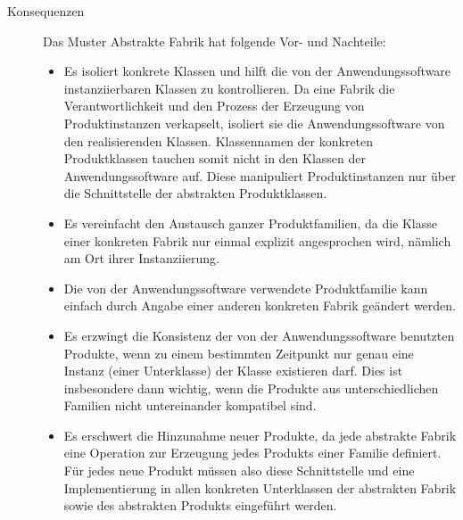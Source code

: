 \begin{description}
	\vspace{1mm} %
	
	\item[Konsequenzen] Das Muster Abstrakte Fabrik hat folgende Vor- und Nachteile:
	\begin{itemize}
		\item 	Es isoliert konkrete Klassen und hilft die von der Anwendungssoftware instanziierbaren Klassen zu kontrollieren. Da eine Fabrik die Verantwortlichkeit und den Prozess der Erzeugung von Produkt\-instanzen verkapselt, isoliert sie die Anwendungssoftware von den realisierenden Klassen. Klassennamen der konkreten Produktklassen tauchen somit nicht in den Klassen der Anwendungssoftware auf. Diese manipuliert Produkt\-instanzen nur über die Schnittstelle der abstrakten Produktklassen.
		\item 	Es vereinfacht den Austausch ganzer Produktfamilien, da die Klasse einer konkreten Fabrik nur einmal explizit angesprochen wird, nämlich am Ort ihrer Instanziierung.
		\item 	Die von der Anwendungssoftware verwendete Produktfamilie kann einfach durch Angabe einer anderen konkreten Fabrik geändert werden. 
		\item 	Es erzwingt die Konsistenz der von der Anwendungssoftware benutzten Produkte, wenn zu einem bestimmten Zeitpunkt nur genau eine Instanz (einer Unterklasse) der Klasse  existieren darf. Dies ist insbesondere dann wichtig, wenn die Produkte aus unterschiedlichen Familien nicht untereinander kompatibel sind.
		\item 	Es erschwert die Hinzunahme neuer Produkte, da jede abstrakte Fabrik eine Operation zur Erzeugung jedes Produkts einer Familie definiert. Für jedes neue Produkt müssen also diese Schnittstelle und eine Implementierung in allen konkreten Unterklassen der abstrakten Fabrik sowie des abstrakten Produkts eingeführt werden.
	\end{itemize}
\end{description}
